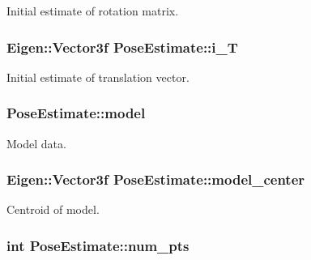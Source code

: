 \-Initial estimate of rotation matrix. 

\hypertarget{classPoseEstimate_a0fa85e3f7cd2b447df9985519a28c0d7}{
\subsubsection[{i\-\_\-\-T}]{\setlength{\rightskip}{0pt plus 5cm}\-Eigen\-::\-Vector3f {\bf \-Pose\-Estimate\-::i\-\_\-\-T}}}\label{classPoseEstimate_a0fa85e3f7cd2b447df9985519a28c0d7}


\-Initial estimate of translation vector. 

\hypertarget{classPoseEstimate_aca9217cfe0d272f172f65adfc31764f1}{
\subsubsection[{model}]{ {\bf \-Pose\-Estimate\-::model}}}\label{classPoseEstimate_aca9217cfe0d272f172f65adfc31764f1}


\-Model data. 

\hypertarget{classPoseEstimate_acd4fefbc3f3fd794f51a8a338996b2ae}{
\subsubsection[{model\-\_\-center}]{\setlength{\rightskip}{0pt plus 5cm}\-Eigen\-::\-Vector3f {\bf \-Pose\-Estimate\-::model\-\_\-center}}}\label{classPoseEstimate_acd4fefbc3f3fd794f51a8a338996b2ae}


\-Centroid of model. 

\hypertarget{classPoseEstimate_a8bad9dfcf6b8ec9e3ba4f62498594524}{
\subsubsection[{num\-\_\-pts}]{\setlength{\rightskip}{0pt plus 5cm}int {\bf \-Pose\-Estimate\-::num\-\_\-pts}}}\label{classPoseEstimate_a8bad9dfcf6b8ec9e3ba4f62498594524}


